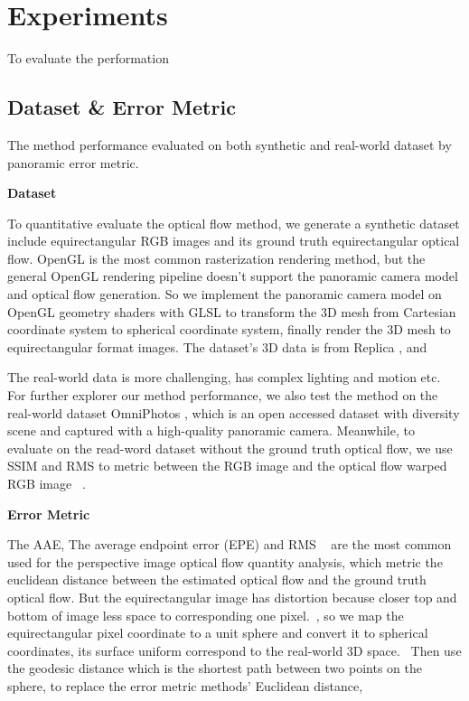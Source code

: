 \section{Experiments}
\label{sec:exp}

To evaluate the performation


\subsection{Dataset \& Error Metric}

The method performance evaluated on both synthetic and real-world dataset by panoramic error metric.

\textbf{Dataset}

To quantitative evaluate the optical flow method, we generate a synthetic dataset include equirectangular RGB images and its ground truth equirectangular optical flow.
OpenGL is the most common rasterization rendering method, but the general OpenGL rendering pipeline doesn't support the panoramic camera model and optical flow generation.
So we implement the panoramic camera model on OpenGL geometry shaders with GLSL to transform the 3D mesh from Cartesian coordinate system to spherical coordinate system, finally render the 3D mesh to equirectangular format images.
The dataset's 3D data is from Replica \cite{StrauWMCWGEMRVCYBYPYZLCBGMPSBSNGLN2019}, and 

The real-world data is more challenging, has complex lighting and motion etc. 
For further explorer our method performance,  we also test the method on the real-world dataset OmniPhotos \cite{BerteYLR2020}, which is an open accessed dataset with diversity scene and captured with a high-quality panoramic camera.
Meanwhile, to evaluate on the read-word dataset without the ground truth optical flow, we use SSIM and RMS to metric between the RGB image and the optical flow warped RGB image ~\cite{???}.

\textbf{Error Metric}

The AAE, The average endpoint error (EPE) and RMS  ~\cite{BakerSLRBS2011} are the most common used for the perspective image optical flow quantity analysis, which metric the euclidean distance between the estimated optical flow and the ground truth optical flow.
But the equirectangular image has distortion because closer top and bottom of image less space to corresponding one pixel.~\cite{??},
so we map the equirectangular pixel coordinate to a unit sphere and convert it to spherical coordinates, its surface uniform correspond to the real-world 3D space.~\cite{??}
Then use the geodesic distance which is the shortest path between two points on the sphere,  to replace the error metric methods' Euclidean distance, 

